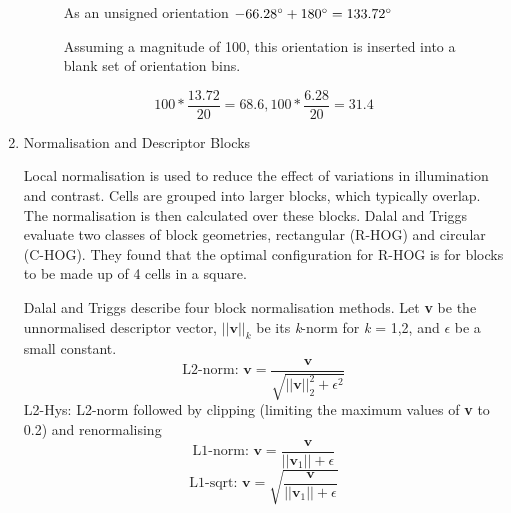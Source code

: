 \begin{enumerate}
\begin{figure}[H]
        As an unsigned orientation $-66.28\degree + 180\degree = 133.72\degree$
        
        Assuming a magnitude of 100, this orientation is inserted into a blank set of orientation bins.
        
        \[100 * \frac{13.72}{20} = 68.6, 100 * \frac{6.28}{20} = 31.4 \]
        
    \end{figure}
    
    \item Normalisation and Descriptor Blocks
    
    Local normalisation is used to reduce the effect of variations in illumination and contrast. Cells are grouped into larger blocks, which typically overlap. The normalisation is then calculated over these blocks. Dalal and Triggs evaluate two classes of block geometries, rectangular (R-HOG) and circular (C-HOG). They found that the optimal configuration for R-HOG is for blocks to be made up of 4 cells in a square. 
    
    Dalal and Triggs describe four block normalisation methods. Let \textbf{v} be the unnormalised descriptor vector, $||\textbf{v}||_k$ be its \textit{k}-norm  for \textit{k} = 1,2, and $\epsilon$ be a small constant. 
    \[ \text{L2-norm: } \textbf{v} = \frac{\textbf{v}}{\sqrt{||\textbf{v}||^2_2 + \epsilon^2}} \]
    L2-Hys: L2-norm followed by clipping (limiting the maximum values of \textbf{v} to 0.2) and renormalising
    \[ \text{L1-norm: } \textbf{v} = \frac{\textbf{v}}{||\textbf{v}_1|| + \epsilon} \]
    \[ \text{L1-sqrt: } \textbf{v} = \sqrt{\frac{\textbf{v}}{||\textbf{v}_1|| + \epsilon}} \]
    
\end{enumerate}


